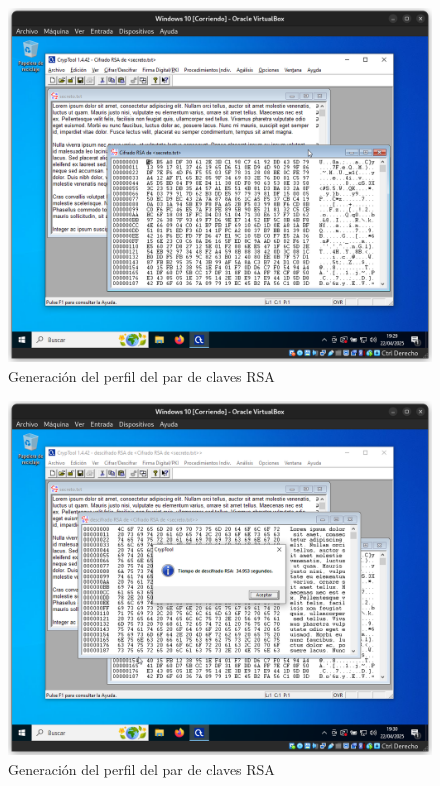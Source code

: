 \begin{figure}[H]
    \includegraphics[width=15cm]{EncriptadoRSA-3}
    \caption{Generación del perfil del par de claves RSA}
\end{figure}

\begin{figure}[H]
    \includegraphics[width=15cm]{DesencriptadoRSA-1}
    \caption{Generación del perfil del par de claves RSA}
\end{figure}

